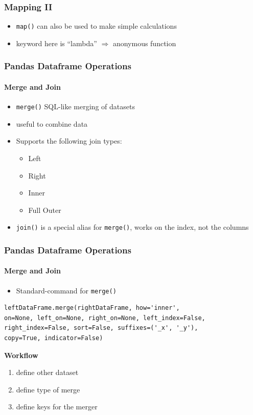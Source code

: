 \documentclass[ngerman]{beamer}
\begin{document}
\begin{frame}[fragile]
\frametitle{Mapping II}

\begin{itemize}
	\item \texttt{map()} can also be used to make simple calculations
	\item keyword here is \enquote{lambda} $\Rightarrow$ anonymous function	
\end{itemize}



\end{frame}

\begin{frame}[fragile]
\frametitle{Pandas Dataframe Operations}
\framesubtitle{Merge and Join}

\begin{itemize}
\item \texttt{merge()} SQL-like merging of datasets
\item useful to combine data
\item Supports the following join types:
\begin{itemize}
	\item Left
	\item Right
	\item Inner
	\item Full Outer
\end{itemize}
\item \texttt{join()} is a special alias for \texttt{merge()},  works on \newline the index, not the columns
\end{itemize}

\end{frame}

\begin{frame}[fragile]
\frametitle{Pandas Dataframe Operations}
\framesubtitle{Merge and Join}

\begin{itemize}
	\item Standard-command for \texttt{merge()}
\end{itemize}

\begin{lstlisting}
leftDataFrame.merge(rightDataFrame, how='inner', 
on=None, left_on=None, right_on=None, left_index=False, 
right_index=False, sort=False, suffixes=('_x', '_y'), 
copy=True, indicator=False)
\end{lstlisting}

\textbf{Workflow}

\begin{enumerate}
\item define other dataset
\item define type of merge
\item define keys for the merger
\end{enumerate}

\end{frame}
\end{document}
